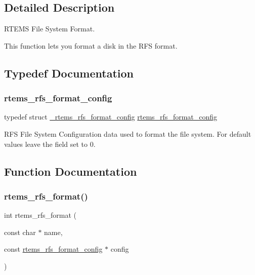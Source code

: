 \subsection{Detailed Description}
R\+T\+E\+MS File System Format. 

This function lets you format a disk in the R\+FS format. 

\subsection{Typedef Documentation}
\mbox{\label{rtems-rfs-format_8h_a89d46e05dca9605cef445458620bb003}} 
\subsubsection{\texorpdfstring{rtems\_rfs\_format\_config}{rtems\_rfs\_format\_config}}
{\footnotesize\ttfamily typedef struct \mbox{\hyperlink{struct__rtems__rfs__format__config}{\+\_\+rtems\+\_\+rfs\+\_\+format\+\_\+config}}  \mbox{\hyperlink{rtems-rfs-format_8h_a89d46e05dca9605cef445458620bb003}{rtems\+\_\+rfs\+\_\+format\+\_\+config}}}

R\+FS File System Configuration data used to format the file system. For default values leave the field set to 0. 

\subsection{Function Documentation}
\mbox{\label{rtems-rfs-format_8h_a56f021e1569663ecb2f46921a35e1a17}} 
\subsubsection{\texorpdfstring{rtems\_rfs\_format()}{rtems\_rfs\_format()}}
{\footnotesize\ttfamily int rtems\+\_\+rfs\+\_\+format (\begin{DoxyParamCaption}\item[{const char $\ast$}]{name,  }\item[{const \mbox{\hyperlink{rtems-rfs-format_8h_a89d46e05dca9605cef445458620bb003}{rtems\+\_\+rfs\+\_\+format\+\_\+config}} $\ast$}]{config }\end{DoxyParamCaption})}

